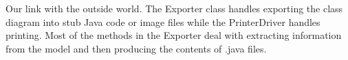 \tab Our link with the outside world. The Exporter class handles exporting the class diagram into stub Java code or image files while the PrinterDriver handles printing. Most of the methods in the Exporter deal with extracting information from the model and then producing the contents of .java files.


